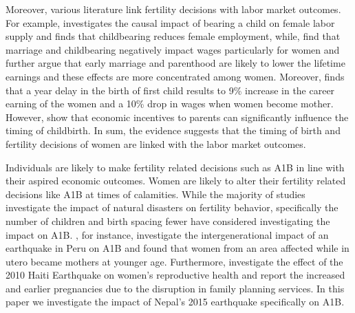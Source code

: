 \documentclass[11pt,a4paper]{article}
\begin{document}
Moreover, various literature link fertility decisions with labor market outcomes. For example, \citet{cristia2008effect} investigates the causal impact of bearing a child on female labor supply and finds that childbearing reduces female employment, while, \citet{loughran2009wait} find that marriage and childbearing negatively impact wages particularly for women and further argue that early marriage and parenthood are likely to lower the lifetime earnings and these effects are more concentrated among women. Moreover, \citet{miller2009motherhood} finds that a year delay in the birth of first child results to 9\% increase in the career earning of the women and a 10\% drop in wages when women become mother.     
However, \citet{neugart2013economic} show that economic incentives to parents can significantly influence the timing of childbirth. In sum, the evidence suggests that the timing of birth and fertility decisions of women are linked with the labor market outcomes. 

\vspace{0.25cm}

Individuals are likely to make fertility related decisions such as A1B in line with their aspired economic outcomes. Women are likely to alter their fertility related decisions like A1B at times of calamities. While the majority of studies investigate the impact of natural disasters on fertility behavior, specifically the number of children and birth spacing \citep{seltzer2017post, nobles2014effects, evans2010fertility, finlay2009fertility} fewer have considered investigating the impact on A1B. 
\citet{caruso2015long}, for instance, investigate the intergenerational impact of an earthquake in Peru on A1B and found that women from an area affected while in utero became mothers at younger age. Furthermore, \citet{behrman2016effects} investigate the effect of the 2010 Haiti Earthquake on women's reproductive health and report the increased and earlier pregnancies due to the disruption in family planning services. In this paper we investigate the impact of Nepal's 2015 earthquake specifically on A1B.   

\vspace{0.25 cm}
\end{document}

